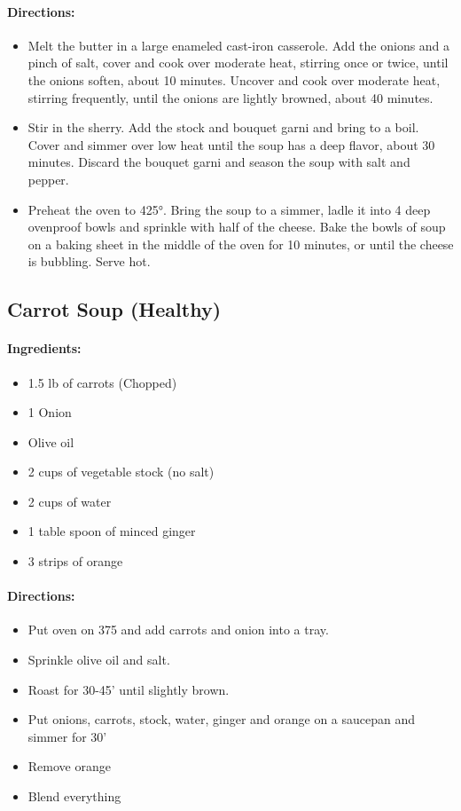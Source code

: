 \documentclass{article}
\begin{document}
\paragraph{Directions:}
\begin{itemize}
    \item Melt the butter in a large enameled cast-iron casserole. Add the onions and a pinch of salt, cover and cook over moderate heat, stirring once or twice, until the onions soften, about 10 minutes. Uncover and cook over moderate heat, stirring frequently, until the onions are lightly browned, about 40 minutes.
    \item Stir in the sherry. Add the stock and bouquet garni and bring to a boil. Cover and simmer over low heat until the soup has a deep flavor, about 30 minutes. Discard the bouquet garni and season the soup with salt and pepper.
    \item Preheat the oven to 425°. Bring the soup to a simmer, ladle it into 4 deep ovenproof bowls and sprinkle with half of the cheese. Bake the bowls of soup on a baking sheet in the middle of the oven for 10 minutes, or until the cheese is bubbling. Serve hot.
\end{itemize}

\subsection{Carrot Soup (Healthy)}

\paragraph{Ingredients:}
\begin{itemize}
    \item 1.5 lb of carrots (Chopped)
    \item 1 Onion
    \item Olive oil
    \item 2 cups of vegetable stock (no salt)
    \item 2 cups of water
    \item 1 table spoon of minced ginger
    \item 3 strips of orange
\end{itemize}

\paragraph{Directions:}
\begin{itemize}
    \item Put oven on 375 and add carrots and onion into a tray.
    \item Sprinkle olive oil and salt.
    \item Roast for 30-45' until slightly brown.
    \item Put onions, carrots, stock, water, ginger and orange on a saucepan and simmer for 30'
    \item Remove orange
    \item Blend everything
\end{itemize}
\end{document}
